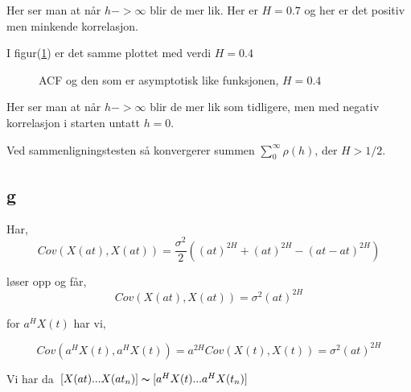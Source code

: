 \documentclass[12pt]{article}
\begin{document}
{Her ser man at når $h -> \infty$ blir de mer lik. Her er $H = 0.7$ og her er det positiv men minkende korrelasjon.

I figur(\ref{asymp2}) er det samme plottet med verdi $H = 0.4$

\begin{figure}[hbt!]
\caption{ACF og den som er asymptotisk like funksjonen, $H = 0.4$}
\label{asymp2}
\end{figure}

Her ser man at når $h -> \infty$ blir de mer lik som tidligere, men med negativ korrelasjon i starten untatt $h = 0$.

Ved sammenligningstesten så konvergerer summen $\sum_{0}^{\infty} \rho(h)$, der $H > 1/2$.

\subsection{g}
Har,
\begin{equation}
Cov(X(at),X(at)) = \frac{\sigma^2}{2}((at)^{2H} + (at)^{2H} - ( at - at)^{2H})
\end{equation}

løser opp og får,
\begin{equation}
  Cov(X(at),X(at)) = \sigma^2(at)^{2H}
  \end{equation}

for $a^{H}X(t)$ har vi,

\begin{equation}
  Cov(a^{H}X(t),a^{H}X(t)) = a^{2H}Cov(X(t), X(t)) = \sigma^2(at)^{2H}
  \end{equation}

  Vi har da $[X(at)...X(at_{n})]\thicksim[a^{H}X(t)...a^{H}X(t_{n})]$


}
\end{document}
